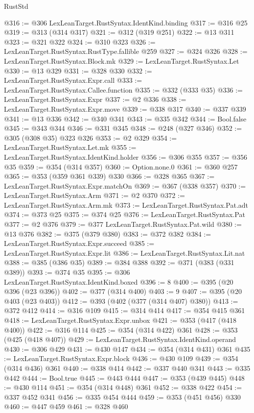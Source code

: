 \begin{lexlean}{RustStd}
\begin{coremodule}
{\begin{coremodule}
{{{{{{{{@316 := @306 LexLeanTarget.RustSyntax.IdentKind.binding
@317 := @316 @25
@319 := @313 (@314 @317)
@321 := @312 (@319 @251)
@322 := @13 @311
@323 := @321 @322
@324 := @310 @323
@326 := LexLeanTarget.RustSyntax.RustType.fallible @259
@327 := @324 @326
@328 := LexLeanTarget.RustSyntax.Block.mk
@329 := LexLeanTarget.RustSyntax.Let
@330 := @13 @329
@331 := @328 @330
@332 := LexLeanTarget.RustSyntax.Expr.call
@333 := LexLeanTarget.RustSyntax.Callee.function
@335 := @332 (@333 @35)
@336 := LexLeanTarget.RustSyntax.Expr
@337 := @2 @336
@338 := LexLeanTarget.RustSyntax.Expr.move
@339 := @338 @317
@340 := @337 @339
@341 := @13 @336
@342 := @340 @341
@343 := @335 @342
@344 := Bool.false
@345 := @343 @344
@346 := @331 @345
@348 := @248 (@327 @346)
@352 := @305 (@308 @35) @323 @326
@353 := @2 @329
@354 := LexLeanTarget.RustSyntax.Let.mk
@355 := LexLeanTarget.RustSyntax.IdentKind.holder
@356 := @306 @355
@357 := @356 @35
@359 := @354 (@314 @357)
@360 := Option.none.{0}
@361 := @360 @257
@365 := @353 (@359 @361 @339) @330
@366 := @328 @365
@367 := LexLeanTarget.RustSyntax.Expr.matchOn
@369 := @367 (@338 @357)
@370 := LexLeanTarget.RustSyntax.Arm
@371 := @2 @370
@372 := LexLeanTarget.RustSyntax.Arm.mk
@373 := LexLeanTarget.RustSyntax.Pat.adt
@374 := @373 @25
@375 := @374 @25
@376 := LexLeanTarget.RustSyntax.Pat
@377 := @2 @376
@379 := @377 LexLeanTarget.RustSyntax.Pat.wild
@380 := @13 @376
@382 := @375 (@379 @380)
@383 := @372 @382
@384 := LexLeanTarget.RustSyntax.Expr.succeed
@385 := LexLeanTarget.RustSyntax.Expr.lit
@386 := LexLeanTarget.RustSyntax.Lit.nat
@388 := @385 (@386 @35)
@389 := @384 @388
@392 := @371 (@383 (@331 @389))
@393 := @374 @35
@395 := @306 LexLeanTarget.RustSyntax.IdentKind.boxed
@396 := 8
@400 := @395 (@20 @396 (@23 @396))
@402 := @377 (@314 @400)
@403 := 9
@407 := @395 (@20 @403 (@23 @403))
@412 := @393 (@402 (@377 (@314 @407) @380))
@413 := @372 @412
@414 := @316 @109
@415 := @314 @414
@417 := @354 @415 @361
@418 := LexLeanTarget.RustSyntax.Expr.unbox
@421 := @353 (@417 (@418 @400))
@422 := @316 @114
@425 := @354 (@314 @422) @361
@428 := @353 (@425 (@418 @407))
@429 := LexLeanTarget.RustSyntax.IdentKind.operand
@430 := @306 @429
@431 := @430 @147
@434 := @354 (@314 @431) @361
@435 := LexLeanTarget.RustSyntax.Expr.block
@436 := @430 @109
@439 := @354 (@314 @436) @361
@440 := @338 @414
@442 := @337 @440 @341
@443 := @335 @442
@444 := Bool.true
@445 := @443 @444
@447 := @353 (@439 @445)
@448 := @430 @114
@451 := @354 (@314 @448) @361
@452 := @338 @422
@454 := @337 @452 @341
@456 := @335 @454 @444
@459 := @353 (@451 @456) @330
@460 := @447 @459
@461 := @328 @460
}}}}}}}}
\end{coremodule}}
\end{coremodule}
\end{lexlean}

